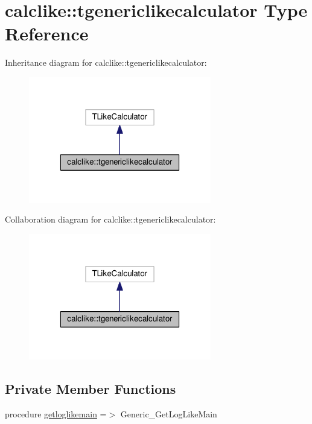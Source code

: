 \hypertarget{structcalclike_1_1tgenericlikecalculator}{}\section{calclike\+:\+:tgenericlikecalculator Type Reference}
\label{structcalclike_1_1tgenericlikecalculator}


Inheritance diagram for calclike\+:\+:tgenericlikecalculator\+:
\nopagebreak
\begin{figure}[H]
\begin{center}
\leavevmode
\includegraphics[width=226pt]{structcalclike_1_1tgenericlikecalculator__inherit__graph}
\end{center}
\end{figure}


Collaboration diagram for calclike\+:\+:tgenericlikecalculator\+:
\nopagebreak
\begin{figure}[H]
\begin{center}
\leavevmode
\includegraphics[width=226pt]{structcalclike_1_1tgenericlikecalculator__coll__graph}
\end{center}
\end{figure}
\subsection*{Private Member Functions}
\begin{DoxyCompactItemize}
\item 
procedure \mbox{\hyperlink{structcalclike_1_1tgenericlikecalculator_ad935f0fe5ea6abeb062e58f45e46ec7c}{getloglikemain}} =$>$ Generic\+\_\+\+Get\+Log\+Like\+Main
\end{DoxyCompactItemize}


